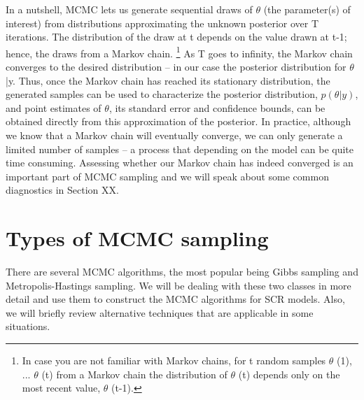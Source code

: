 In a nutshell, MCMC lets us generate sequential draws of $\theta$ (the
parameter(s) of interest) from distributions approximating the unknown
posterior over T iterations. The distribution of the draw at t depends
on the value drawn at t-1; hence, the draws from a Markov
chain. \footnote{In case you are not familiar with Markov chains, for
  t random samples $\theta$ (1), ... $\theta$ (t) from a Markov chain
  the distribution of $\theta$ (t) depends only on the most recent
  value, $\theta$ (t-1).} As T goes to infinity, the Markov chain
converges to the desired distribution – in our case the posterior
distribution for $\theta$|y. Thus, once the Markov chain has reached
its stationary distribution, the generated samples can be used to
characterize the posterior distribution, $p(\theta|y)$, and point
estimates of $\theta$, its standard error and confidence bounds, can
be obtained directly from this approximation of the posterior. In
practice, although we know that a Markov chain will eventually
converge, we can only generate a limited number of samples – a process
that depending on the model can be quite time consuming. Assessing
whether our Markov chain has indeed converged is an important part of
MCMC sampling and we will speak about some common diagnostics in
Section XX.

\section{Types of MCMC sampling}
There are several MCMC algorithms, the most popular being Gibbs sampling and Metropolis-Hastings sampling. We will be dealing with these two classes in more detail and use them to construct the MCMC algorithms for SCR models. Also, we will briefly review alternative techniques that are applicable in some situations. 
